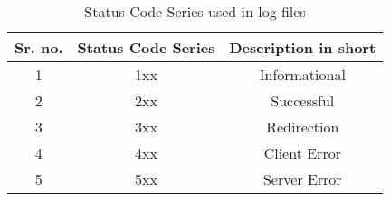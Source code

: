 \documentclass{RCPT}
\begin{document}
\begin{table}
  \centering
  \caption{Status Code Series used in log files}\label{Status Code Series used in log files}
  \begin{tabular}{| c | c | c |}
  \hline
  {\bf Sr. no.} & {\bf Status Code Series} & {\bf Description in short} \\ \hline
 1 & 1xx & Informational \\ \hline
 2 & 2xx & Successful \\ \hline
 3 & 3xx & Redirection\\ \hline
 4 & 4xx & Client Error\\ \hline
 5 & 5xx & Server Error \\ \hline
  
  \end{tabular}
\end{table}
\end{document}
